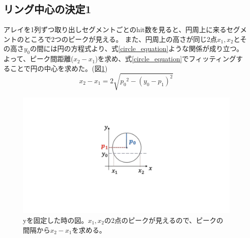 \documentclass[uplatex, titlepage, dvipdfmx, 12pt, a4paper]{jsreport}
\begin{document}
    \subsection{リング中心の決定1}
      アレイを1列ずつ取り出しセグメントごとのhit数を見ると、円周上に来るセグメントのところで2つのピークが見える。
      また、円周上の高さが同じ2点$x_1,x_2$とその高さ$y_0$の間には円の方程式より、式\ref{circle_equation}ような関係が成り立つ。
      よって、ピーク間距離($x_2-x_1$)を求め、式\ref{circle_equation}でフィッティングすることで円の中心を求めた。(図\ref{fig:find_center_image})
      \begin{equation}
        x_2 - x_1 = 2\sqrt{{p_0}^2-{\left(y_0-p_1\right)}^2}
        \label{circle_equation}
      \end{equation}
      \begin{figure}[hbtp]
        \begin{center}
          \includegraphics[scale=1, clip]{image/find_center1.pdf}
          \caption{yを固定した時の図。$x_1, x_2$の2点のピークが見えるので、ピークの間隔から$x_2-x_1$を求める。} 
          \label{fig:find_center_image} 
        \end{center}
      \end{figure}
\end{document}
